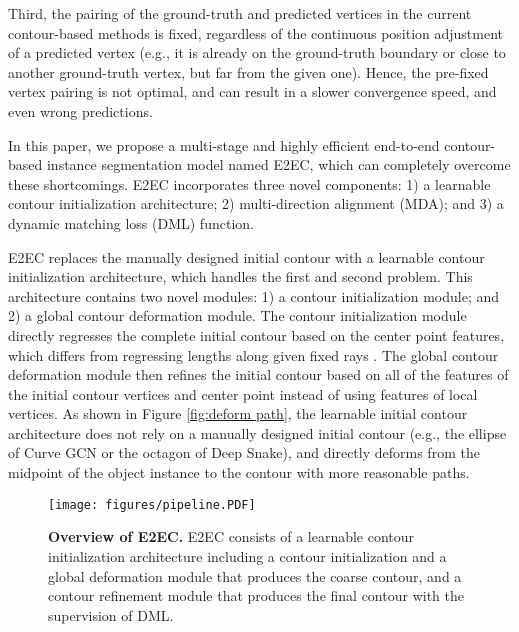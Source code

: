 \documentclass[10pt,twocolumn,letterpaper]{article}
\begin{document}
Third, the pairing of the ground-truth and predicted vertices in the current contour-based methods is fixed, regardless of the continuous position adjustment of a predicted vertex (e.g., it is already on the ground-truth boundary or close to another ground-truth vertex, but far from the given one). Hence, the pre-fixed vertex pairing is not optimal, and can result in a slower convergence speed, and even wrong predictions.

In this paper, we propose a multi-stage and highly efficient end-to-end contour-based instance segmentation model named E2EC, which can completely overcome these shortcomings. E2EC incorporates three novel components: 1) a learnable contour initialization architecture; 2) multi-direction alignment (MDA); and 3) a dynamic matching loss (DML) function.

E2EC replaces the manually designed initial contour with a learnable contour initialization architecture, which handles the first and second problem. This architecture contains two novel modules: 1) a contour initialization module; and 2) a global contour deformation module. The contour initialization module directly regresses the complete initial contour based on the center point features, which differs from regressing lengths along given fixed rays \cite{polarmask}. The global contour deformation module then refines the initial contour based on all of the features of the initial contour vertices and center point instead of using features of local vertices. As shown in Figure \ref{fig:deform path}, the learnable initial contour architecture does not rely on a manually designed initial contour (e.g., the ellipse of Curve GCN or the octagon of Deep Snake), and directly deforms from the midpoint of the object instance to the contour with more reasonable paths.
\begin{figure}[t]
  \centering
   \texttt{[image: figures/pipeline.PDF]}\vspace{-3mm}
   \caption{\textbf{Overview of E2EC.} E2EC consists of a learnable contour initialization architecture including a contour initialization and a global deformation module that produces the coarse contour, and a contour refinement module that produces the final contour with the supervision of DML.}
   \vspace{-11mm}
   \label{fig:pipeline}
\end{figure}
\end{document}
